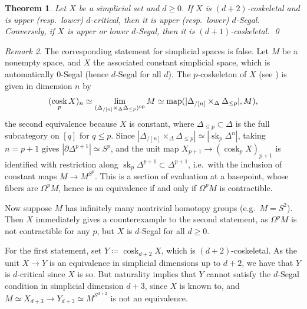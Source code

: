 \documentclass{amsart}
\newcommand{\op}{\textup{op}}
\DeclareMathOperator{\cosk}{cosk}
\DeclareMathOperator{\sk}{sk}
\DeclareMathOperator{\map}{map}
\newtheorem{theorem}{Theorem}
\theoremstyle{definition}
\theoremstyle{remark}
\newtheorem{remark}[theorem]{Remark}
\begin{document}
\begin{theorem}\label{thm main theorem}
Let $X$ be a simplicial set and $d \geq 0$.
If $X$ is $(d{+}2)$-coskeletal and is upper (resp.\ lower) $d$-critical, then it is upper (resp.\ lower) $d$-Segal.
Conversely, if $X$ is upper or lower $d$-Segal, then it is $(d{+}1)$-coskeletal. \qed
\end{theorem}


\begin{remark}\label{rmk simplicial anima}
The corresponding statement for simplicial spaces is false.
Let $M$ be a nonempty space, and $X$ the associated constant simplicial space, which is automatically $0$-Segal (hence $d$-Segal for all $d$).
The $p$-coskeleton of $X$ (see \cite[\href{https://kerodon.net/tag/05GU}{Tag 05GU}]{kerodon}) is given in dimension $n$ by 
\[
	(\cosk_p X)_n \simeq \lim_{(\Delta_{/[n]} \times_\Delta \Delta_{\leq p})^\op} M \simeq \map(|\Delta_{/[n]} \times_\Delta \Delta_{\leq p}|, M),
\]
the second equivalence because $X$ is constant, 
where $\Delta_{\leq p} \subset \Delta$ is the full subcategory on $[q]$ for $q \leq p$.
Since $|\Delta_{/[n]} \times_\Delta \Delta_{\leq p}| \simeq |\sk_p \Delta^n|$, taking $n=p+1$ gives $|\partial \Delta^{p+1}| \simeq S^p$, and the unit map $X_{p+1} \to (\cosk_p X)_{p+1}$ is identified with restriction along $\sk_p \Delta^{p+1} \subset \Delta^{p+1}$, i.e.\ with the inclusion of constant maps $M \to M^{S^p}$.
This is a section of evaluation at a basepoint, whose fibers are $\Omega^p M$, hence is an equivalence if and only if $\Omega^p M$ is contractible.

Now suppose $M$ has infinitely many nontrivial homotopy groups (e.g.\ $M=S^2$).
Then $X$ immediately gives a counterexample to the second statement, as $\Omega^p M$ is not contractible for any $p$, but $X$ is $d$-Segal for all $d\geq 0$.

For the first statement, set $Y \coloneq \cosk_{d+2} X$, which is $(d{+}2)$-coskeletal. 
As the unit $X \to Y$ is an equivalence in simplicial dimensions up to $d+2$, we have that $Y$ is $d$-critical since $X$ is so.
But naturality implies that $Y$ cannot satisfy the $d$-Segal condition in simplicial dimension $d+3$, since $X$ is known to, and $M \simeq X_{d+3} \to Y_{d+3} \simeq M^{S^{d+2}}$ is not an equivalence.
\end{remark}



\end{document}
